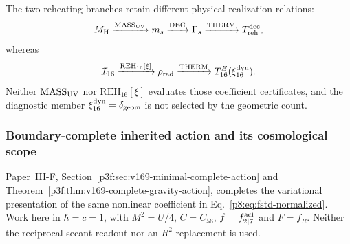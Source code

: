 \documentclass[12pt,a4paper]{article}
\begin{document}
\begin{remark}
The two reheating branches retain different physical realization relations:
\[
 M_{\rm H}\xrightarrow{\mathrm{MASS}_{\rm UV}}m_s
 \xrightarrow{\mathrm{DEC}}\Gamma_s
 \xrightarrow{\mathrm{THERM}}T_{\rm reh}^{\rm dec},
\]
whereas
\[
 \mathcal I_{16}\xrightarrow{\mathrm{REH}_{16}[\xi]}
 \rho_{\rm rad}\xrightarrow{\mathrm{THERM}}T_{16}^{E}(\xi_{16}^{\rm dyn}).
\]
Neither \(\mathrm{MASS}_{\rm UV}\) nor
\(\mathrm{REH}_{16}[\xi]\) evaluates those coefficient certificates, and the diagnostic
member \(\xi_{16}^{\rm dyn}=\delta_{\rm geom}\) is not selected by the geometric count.
\end{remark}

\subsubsection{Boundary-complete inherited action and its cosmological scope}
\label{p8:sec:v2171-complete-cosmological-action}
Paper~III-F, Section~\ref{p3f:sec:v169-minimal-complete-action} and
Theorem~\ref{p3f:thm:v169-complete-gravity-action}, completes the variational
presentation of the same nonlinear coefficient in
Eq.~\eqref{p8:eq:fstd-normalized}. Work here in $\hbar=c=1$, with
$M^2=U/4$, $C=C_{56}$, $f=f_{2\mid7}^{\rm act}$ and $F=f_R$.
Neither the reciprocal secant readout nor an $R^2$ replacement is used.
\end{document}
